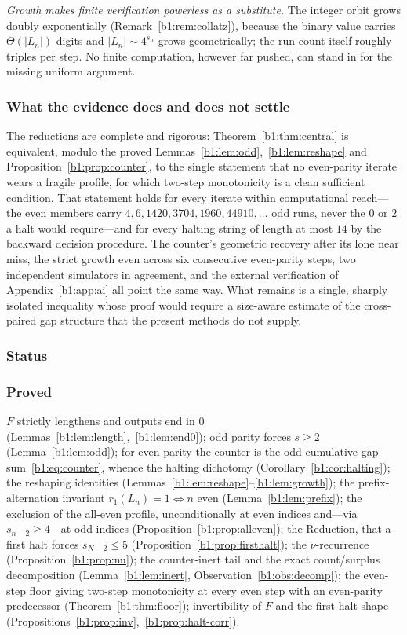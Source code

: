 \documentclass[a4paper]{article}
\theoremstyle{plain}
\theoremstyle{definition}
\theoremstyle{remark}
\begin{document}
\emph{Growth makes finite verification powerless as a substitute.} The integer orbit grows doubly exponentially (Remark~\ref{b1:rem:collatz}), because the binary value carries $\Theta(|L_n|)$ digits and $|L_n|\sim 4^{s_n}$ grows geometrically; the run count itself roughly triples per step. No finite computation, however far pushed, can stand in for the missing uniform argument.

\subsubsection{What the evidence does and does not settle}\label{b1:sec:13.3}
The reductions are complete and rigorous: Theorem~\ref{b1:thm:central} is equivalent, modulo the proved Lemmas~\ref{b1:lem:odd},~\ref{b1:lem:reshape} and Proposition~\ref{b1:prop:counter}, to the single statement that no even-parity iterate wears a fragile profile, for which two-step monotonicity is a clean sufficient condition. That statement holds for every iterate within computational reach---the even members carry $4,6,1420,3704,1960,44910,\dots$ odd runs, never the $0$ or $2$ a halt would require---and for every halting string of length at most $14$ by the backward decision procedure. The counter's geometric recovery after its lone near miss, the strict growth even across six consecutive even-parity steps, two independent simulators in agreement, and the external verification of Appendix~\ref{b1:app:ai} all point the same way. What remains is a single, sharply isolated inequality whose proof would require a size-aware estimate of the cross-paired gap structure that the present methods do not supply.

\subsubsection{Status}\label{b1:sec:status}
\subsubsection*{Proved} $F$ strictly lengthens and outputs end in $0$ (Lemmas~\ref{b1:lem:length},~\ref{b1:lem:end0}); odd parity forces $s\ge 2$ (Lemma~\ref{b1:lem:odd}); for even parity the counter is the odd-cumulative gap sum~\eqref{b1:eq:counter}, whence the halting dichotomy (Corollary~\ref{b1:cor:halting}); the reshaping identities (Lemmas~\ref{b1:lem:reshape}--\ref{b1:lem:growth}); the prefix-alternation invariant $r_1(L_n)=1\iff n$ even (Lemma~\ref{b1:lem:prefix}); the exclusion of the all-even profile, unconditionally at even indices and---via $s_{n-2}\ge 4$---at odd indices (Proposition~\ref{b1:prop:alleven}); the Reduction, that a first halt forces $s_{N-2}\le 5$ (Proposition~\ref{b1:prop:firsthalt}); the $\nu$-recurrence (Proposition~\ref{b1:prop:nu}); the counter-inert tail and the exact count/surplus decomposition (Lemma~\ref{b1:lem:inert}, Observation~\ref{b1:obs:decomp}); the even-step floor giving two-step monotonicity at every even step with an even-parity predecessor (Theorem~\ref{b1:thm:floor}); invertibility of $F$ and the first-halt shape (Propositions~\ref{b1:prop:inv},~\ref{b1:prop:halt-corr}).
\end{document}
